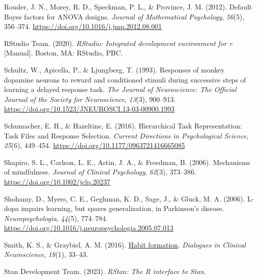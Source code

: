 \documentclass[
  man]{apa6}
\newlength{\cslhangindent}
\newlength{\cslentryspacingunit} %
\newenvironment{CSLReferences}[2] %
 {%
  \setlength{\parindent}{0pt}
  \ifodd #1
  \let\oldpar\par
  \def\par{\hangindent=\cslhangindent\oldpar}
  \fi
  \setlength{\parskip}{#2\cslentryspacingunit}
 }%
 {}
\begin{document}
\begin{CSLReferences}{1}{0}
\leavevmode{}%
Rouder, J. N., Morey, R. D., Speckman, P. L., \& Province, J. M. (2012). Default {Bayes} factors for {ANOVA} designs. \emph{Journal of Mathematical Psychology}, \emph{56}(5), 356--374. \url{https://doi.org/10.1016/j.jmp.2012.08.001}

\leavevmode{}%
RStudio Team. (2020). \emph{{RStudio}: {Integrated} development environment for r} {[}Manual{]}. {Boston, MA}: {RStudio, PBC.}

\leavevmode{}%
Schultz, W., Apicella, P., \& Ljungberg, T. (1993). Responses of monkey dopamine neurons to reward and conditioned stimuli during successive steps of learning a delayed response task. \emph{The Journal of Neuroscience: The Official Journal of the Society for Neuroscience}, \emph{13}(3), 900--913. \url{https://doi.org/10.1523/JNEUROSCI.13-03-00900.1993}

\leavevmode{}%
Schumacher, E. H., \& Hazeltine, E. (2016). Hierarchical {Task Representation}: {Task Files} and {Response Selection}. \emph{Current Directions in Psychological Science}, \emph{25}(6), 449--454. \url{https://doi.org/10.1177/0963721416665085}

\leavevmode{}%
Shapiro, S. L., Carlson, L. E., Astin, J. A., \& Freedman, B. (2006). Mechanisms of mindfulness. \emph{Journal of Clinical Psychology}, \emph{62}(3), 373--386. \url{https://doi.org/10.1002/jclp.20237}

\leavevmode{}%
Shohamy, D., Myers, C. E., Geghman, K. D., Sage, J., \& Gluck, M. A. (2006). L-dopa impairs learning, but spares generalization, in {Parkinson}'s disease. \emph{Neuropsychologia}, \emph{44}(5), 774--784. \url{https://doi.org/10.1016/j.neuropsychologia.2005.07.013}

\leavevmode{}%
Smith, K. S., \& Graybiel, A. M. (2016). \href{https://www.ncbi.nlm.nih.gov/pmc/articles/PMC4826769}{Habit formation}. \emph{Dialogues in Clinical Neuroscience}, \emph{18}(1), 33--43.

\leavevmode{}%
Stan Development Team. (2023). \emph{{RStan}: The {R} interface to {Stan}}.


\end{CSLReferences}
\end{document}
